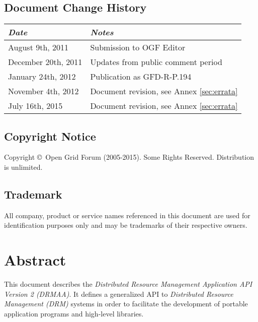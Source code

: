 \documentclass{article}
\newcommand{\copyrightyears}{2005-2015}
\begin{document}
\subsection*{Document Change History}
\vspace*{-1em}
\begin{table}[ht]
\centering
\begin{tabularx}{\textwidth}{XX}
\toprule
\emph{Date} & \emph{Notes} \\
\midrule
August    9th, 2011 & Submission to OGF Editor \\
December 20th, 2011 & Updates from public comment period \\
January  24th, 2012 & Publication as GFD-R-P.194 \\
November  4th, 2012 & Document revision, see Annex \ref{sec:errata} \\
July     16th, 2015 & Document revision, see Annex \ref{sec:errata} \\
\bottomrule
\end{tabularx}
\end{table}
\vspace*{1em}

\subsection*{Copyright Notice}

Copyright \copyright \ Open Grid Forum (\copyrightyears).  Some Rights Reserved.  
Distribution is unlimited.\\

\subsection*{Trademark}

All company, product or service names referenced in this document are used for identification purposes only and may be trademarks of their respective owners. \\

\section*{Abstract}

This document describes the \emph{Distributed Resource Management Application API Version 2 (DRMAA)}. It defines a generalized API to \emph{Distributed Resource Management (DRM)} systems in order to facilitate the development of portable application programs and high-level libraries. 
\end{document}
